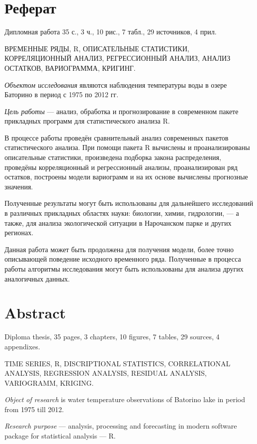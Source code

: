 \newpage

\chapter*{Реферат}
Дипломная работа 35 с., 3 ч., 10 рис., 7 табл., 29 источников, 4 прил.

ВРЕМЕННЫЕ РЯДЫ, R, ОПИСАТЕЛЬНЫЕ СТАТИСТИКИ, КОРРЕЛЯЦИОННЫЙ АНАЛИЗ, РЕГРЕССИОННЫЙ АНАЛИЗ, АНАЛИЗ ОСТАТКОВ, ВАРИОГРАММА, КРИГИНГ.

\textit{Объектом исследования} являются наблюдения температуры воды в озере Баторино в период с 1975 по 2012 гг.

\textit{Цель работы} --- анализ, обработка и прогнозирование в современном пакете прикладных программ для статистического анализа R.

В процессе работы проведён сравнительный анализ современных пакетов статистического анализа. При помощи пакета R вычислены и проанализированы описательные статистики, произведена подборка закона распределения, проведёны корреляционный и регрессионный анализы, проанализирован ряд остатков, построены модели вариограмм и на их основе вычислены прогнозные значения.

Полученные результаты могут быть использованы для дальнейшего исследований в различных прикладных областях науки: биологии, химии, гидрологии, --- а также, для анализа экологической ситуации в Нарочанском парке и других регионах.

Данная работа может быть продолжена для получения модели, более точно описывающей поведение исходного временного ряда. Полученные в процесса работы алгоритмы исследования могут быть использованы для анализа других аналогичных данных.

\newpage

\chapter*{Abstract}
Diploma thesis, 35 pages, 3 chapters, 10 figures, 7 tables, 29 sources, 4 appendixes.

TIME SERIES, R, DISCRIPTIONAL STATISTICS, CORRELATIONAL ANALYSIS, REGRESSION ANALYSIS, RESIDUAL ANALYSIS, VARIOGRAMM, KRIGING.

\textit{Object of research} is water temperature observations of Batorino lake in period from 1975 till 2012.

\textit{Research purpose} --- analysis, processing and forecasting in modern software package for statistical analysis --- R.

